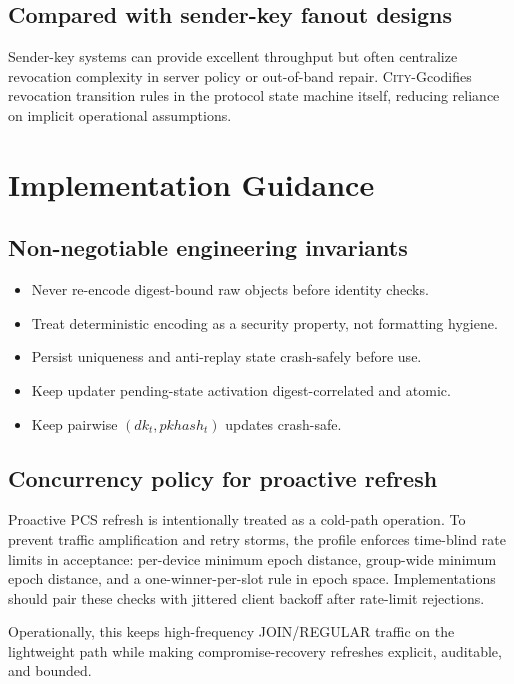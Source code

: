 \documentclass[11pt]{article}
\newcommand{\cityg}{\textsc{City-G}}
\begin{document}
\subsection{Compared with sender-key fanout designs}
Sender-key systems can provide excellent throughput but often centralize revocation complexity in server policy or out-of-band repair. \cityg codifies revocation transition rules in the protocol state machine itself, reducing reliance on implicit operational assumptions.

\section{Implementation Guidance}
\subsection{Non-negotiable engineering invariants}
\begin{itemize}
  \item Never re-encode digest-bound raw objects before identity checks.
  \item Treat deterministic encoding as a security property, not formatting hygiene.
  \item Persist uniqueness and anti-replay state crash-safely before use.
  \item Keep updater pending-state activation digest-correlated and atomic.
  \item Keep pairwise \((dk_t, pkhash_t)\) updates crash-safe.
\end{itemize}

\subsection{Concurrency policy for proactive refresh}
Proactive PCS refresh is intentionally treated as a cold-path operation. To prevent traffic amplification and retry storms, the profile enforces time-blind rate limits in acceptance: per-device minimum epoch distance, group-wide minimum epoch distance, and a one-winner-per-slot rule in epoch space. Implementations should pair these checks with jittered client backoff after rate-limit rejections.

Operationally, this keeps high-frequency JOIN/REGULAR traffic on the lightweight path while making compromise-recovery refreshes explicit, auditable, and bounded.
\end{document}
